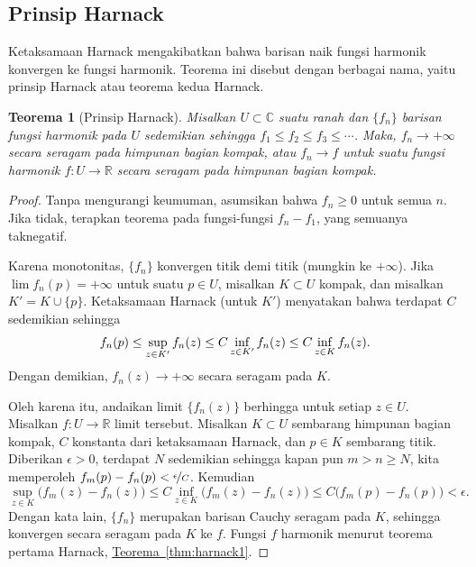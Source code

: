 \documentclass[12pt,openany]{book}
\newcommand{\avoidbreak}{\postdisplaypenalty=100}
\newcommand{\C}{{\mathbb{C}}}
\newcommand{\R}{{\mathbb{R}}}
\theoremstyle{plain}
\newtheorem{thm}{Teorema}[section]
\theoremstyle{remark}
\theoremstyle{definition}
\theoremstyle{exercise}
\theoremstyle{example}
\newcommand{\thmref}[1]{\hyperref[#1]{Teorema~\ref*{#1}}}
\begin{document}
\subsection{Prinsip Harnack}

Ketaksamaan Harnack mengakibatkan bahwa barisan naik 
fungsi harmonik konvergen ke fungsi harmonik.
Teorema ini disebut dengan berbagai nama,
yaitu prinsip Harnack atau teorema kedua Harnack.

\begin{thm}[Prinsip Harnack]
Misalkan $U \subset \C$ suatu ranah dan $\{ f_n \}$ barisan
fungsi harmonik pada $U$ sedemikian sehingga $f_1 \leq f_2 \leq f_3 \leq \cdots$.
Maka, $f_n \to +\infty$ secara seragam pada himpunan bagian kompak, atau
$f_n \to f$ untuk suatu fungsi harmonik $f \colon U \to \R$ secara seragam pada himpunan bagian kompak.
\end{thm}

\begin{proof}
Tanpa mengurangi keumuman, asumsikan bahwa $f_n \geq 0$ untuk semua $n$.
Jika tidak, terapkan teorema pada fungsi-fungsi $f_n-f_1$,
yang semuanya taknegatif.

Karena monotonitas, $\{f_n\}$ konvergen titik demi titik (mungkin ke $+\infty$).
Jika $\lim f_n(p) = +\infty$ untuk suatu $p \in U$, misalkan $K \subset U$
kompak, dan misalkan $K' = K \cup \{ p \}$.
Ketaksamaan Harnack (untuk $K'$) menyatakan bahwa terdapat $C$ sedemikian sehingga
\begin{equation*}
f_n(p) \leq \sup_{z \in K'} f_n(z) \leq C \inf_{z\in K'} f_n(z) \leq C \inf_{z\in K} f_n(z) .
\avoidbreak
\end{equation*}
Dengan demikian, $f_n(z) \to +\infty$ secara seragam pada $K$.

Oleh karena itu, andaikan limit $\{ f_n(z) \}$ berhingga
untuk setiap $z \in U$.  Misalkan $f \colon U \to \R$ limit tersebut.
Misalkan $K \subset U$ sembarang himpunan bagian kompak,
$C$ konstanta dari ketaksamaan Harnack, dan $p \in K$ sembarang titik.
Diberikan $\epsilon > 0$,
terdapat $N$
sedemikian sehingga kapan pun $m > n \geq N$, kita memperoleh
$f_m(p)-f_n(p) < \nicefrac{\epsilon}{C}$.  Kemudian
\begin{equation*}
\sup_{z \in K} \bigl( f_m(z)- f_n(z) \bigr) \leq
C \inf_{z\in K} \bigl( f_m(z)-f_n(z) \bigr)
\leq
C \bigl( f_m(p)-f_n(p) \bigr)
< \epsilon .
\end{equation*}
Dengan kata lain, $\{ f_n \}$ merupakan barisan Cauchy seragam pada $K$, sehingga konvergen
secara seragam pada $K$ ke $f$.  Fungsi $f$ harmonik menurut
teorema pertama Harnack, 
\thmref{thm:harnack1}.
\end{proof}
\end{document}
